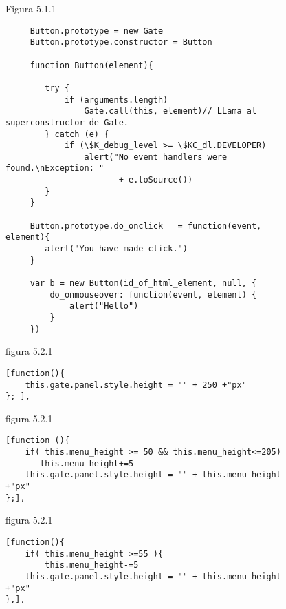 \begin{figure}[p]
Figura 5.1.1
\begin{verbatim}
     Button.prototype = new Gate
     Button.prototype.constructor = Button

     function Button(element){

        try {
            if (arguments.length)
                Gate.call(this, element)// LLama al superconstructor de Gate.
        } catch (e) {
            if (\$K_debug_level >= \$KC_dl.DEVELOPER)
                alert("No event handlers were found.\nException: " 
                       + e.toSource())
        }
     }

     Button.prototype.do_onclick   = function(event, element){
        alert("You have made click.")
     }

     var b = new Button(id_of_html_element, null, {
         do_onmouseover: function(event, element) {
             alert("Hello")
         }
     })
\end{verbatim}
\end{figure}


 
\begin{figure}[p]
figura 5.2.1
\begin{verbatim}
[function(){
    this.gate.panel.style.height = "" + 250 +"px" 
}; ],
\end{verbatim}
\end{figure}


\begin{figure}[p]
figura 5.2.1
\begin{verbatim}
[function (){
    if( this.menu_height >= 50 && this.menu_height<=205)
       this.menu_height+=5
    this.gate.panel.style.height = "" + this.menu_height +"px"
};],
\end{verbatim}
\end{figure}



\begin{figure}[p]
figura 5.2.1
\begin{verbatim}
[function(){
    if( this.menu_height >=55 ){         
        this.menu_height-=5
    this.gate.panel.style.height = "" + this.menu_height +"px"
},],
\end{verbatim}
\end{figure}
